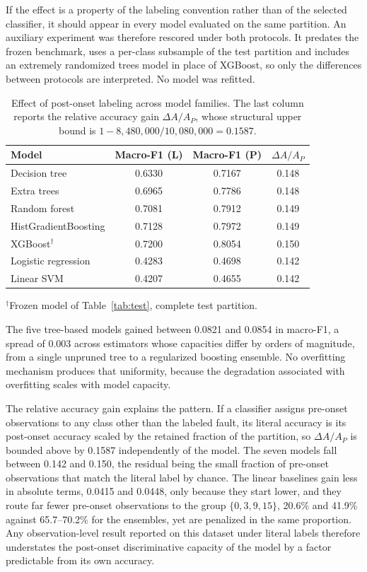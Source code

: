 \documentclass[10pt,twocolumn,a4paper]{article}
\begin{document}
If the effect is a property of the labeling convention rather than of the
selected classifier, it should appear in every model evaluated on the same
partition. An auxiliary experiment was therefore rescored under both protocols.
It predates the frozen benchmark, uses a per-class subsample of the test
partition and includes an extremely randomized trees model in place of XGBoost,
so only the differences between protocols are interpreted. No model was
refitted.

\begin{table}[t]
\centering
\caption{Effect of post-onset labeling across model families. The last column
reports the relative accuracy gain $\Delta A/A_P$, whose structural upper bound
is $1-8{,}480{,}000/10{,}080{,}000=0.1587$.}
\label{tab:generality}
\small
\begin{tabular}{lccc}
\toprule
Model & Macro-F1 (L) & Macro-F1 (P) & $\Delta A/A_P$\\
\midrule
Decision tree           & 0.6330 & 0.7167 & 0.148\\
Extra trees             & 0.6965 & 0.7786 & 0.148\\
Random forest           & 0.7081 & 0.7912 & 0.149\\
HistGradientBoosting    & 0.7128 & 0.7972 & 0.149\\
XGBoost$^{\dagger}$     & 0.7200 & 0.8054 & 0.150\\
Logistic regression     & 0.4283 & 0.4698 & 0.142\\
Linear SVM              & 0.4207 & 0.4655 & 0.142\\
\bottomrule
\end{tabular}

\vspace{2pt}
{\footnotesize $^{\dagger}$Frozen model of Table~\ref{tab:test}, complete test
partition.}
\end{table}

The five tree-based models gained between 0.0821 and 0.0854 in macro-F1, a
spread of 0.003 across estimators whose capacities differ by orders of
magnitude, from a single unpruned tree to a regularized boosting ensemble. No
overfitting mechanism produces that uniformity, because the degradation
associated with overfitting scales with model capacity.

The relative accuracy gain explains the pattern. If a classifier assigns
pre-onset observations to any class other than the labeled fault, its literal
accuracy is its post-onset accuracy scaled by the retained fraction of the
partition, so $\Delta A/A_P$ is bounded above by 0.1587 independently of the
model. The seven models fall between 0.142 and 0.150, the residual being the
small fraction of pre-onset observations that match the literal label by
chance. The linear baselines gain less in absolute terms, 0.0415 and 0.0448,
only because they start lower, and they route far fewer pre-onset observations
to the group $\{0,3,9,15\}$, 20.6\% and 41.9\% against 65.7--70.2\% for the
ensembles, yet are penalized in the same proportion. Any observation-level
result reported on this dataset under literal labels therefore understates the
post-onset discriminative capacity of the model by a factor predictable from
its own accuracy.
\end{document}
